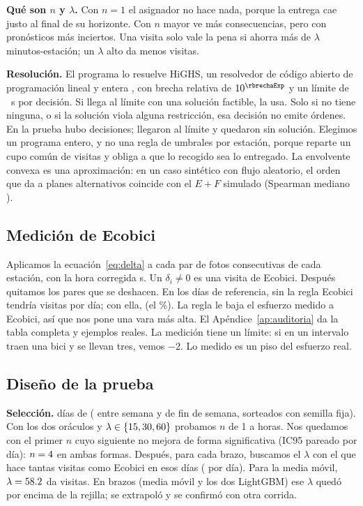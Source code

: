 \documentclass[conference,letterpaper,10pt]{IEEEtran}
\newcommand{\EF}{E+F}
\begin{document}
\textbf{Qué son $n$ y $\lambda$.} Con $n=1$ el asignador no hace nada, porque la entrega cae justo al final de su horizonte. Con $n$ mayor ve más consecuencias, pero con pronósticos más inciertos. Una visita solo vale la pena si ahorra más de $\lambda$ minutos-estación; un $\lambda$ alto da menos visitas.

\textbf{Resolución.} El programa lo resuelve HiGHS, un resolvedor de código abierto de programación lineal y entera \cite{huangfu2018highs}, con brecha relativa de $10^{\rbrechaExp}$ y un límite de \rlimiteS~s por decisión. Si llega al límite con una solución factible, la usa. Solo si no tiene ninguna, o si la solución viola alguna restricción, esa decisión no emite órdenes. En la prueba hubo \rdecTot{} decisiones; \rdecLim{} llegaron al límite y \rdecFallback{} quedaron sin solución. Elegimos un programa entero, y no una regla de umbrales por estación, porque reparte un cupo común de visitas y obliga a que lo recogido sea lo entregado. La envolvente convexa es una aproximación: en un caso sintético con flujo aleatorio, el orden que da a planes alternativos coincide con el $\EF$ simulado (Spearman mediano \rspearman).

\subsection{Medición de Ecobici}
Aplicamos la ecuación~\eqref{eq:delta} a cada par de fotos consecutivas de cada estación, con la hora corregida \rlagS{} s. Un $\delta_i\ne0$ es una visita de Ecobici. Después quitamos los pares que se deshacen. En los \rrefDias{} días de referencia, sin la regla Ecobici tendría \rvisSinRegla{} visitas por día; con ella, \rvisConRegla{} (el \rvisQuedan\%). La regla le baja el esfuerzo medido a Ecobici, así que nos pone una vara más alta. El Apéndice~\ref{ap:auditoria} da la tabla completa y ejemplos reales. La medición tiene un límite: si en un intervalo traen una bici y se llevan tres, vemos $-2$. Lo medido es un piso del esfuerzo real.

\subsection{Diseño de la prueba}
\textbf{Selección.} \rselDias{} días de \rselMes{} (\rselLab{} entre semana y \rselFin{} de fin de semana, sorteados con semilla fija). Con los dos oráculos y $\lambda\in\{15, 30, 60\}$ probamos $n$ de 1 a \rnMax{} horas. Nos quedamos con el primer $n$ cuyo siguiente no mejora de forma significativa (IC95 pareado por día): $n=4$ en ambas formas. Después, para cada brazo, buscamos el $\lambda$ con el que hace tantas visitas como Ecobici en esos días (\rselEcoVis{} por día). Para la media móvil, $\lambda=58.2$ da \rselMaVis{} visitas. En \rlamExtrap{} brazos (media móvil y los dos LightGBM) ese $\lambda$ quedó por encima de la rejilla; se extrapoló y se confirmó con otra corrida.
\end{document}
